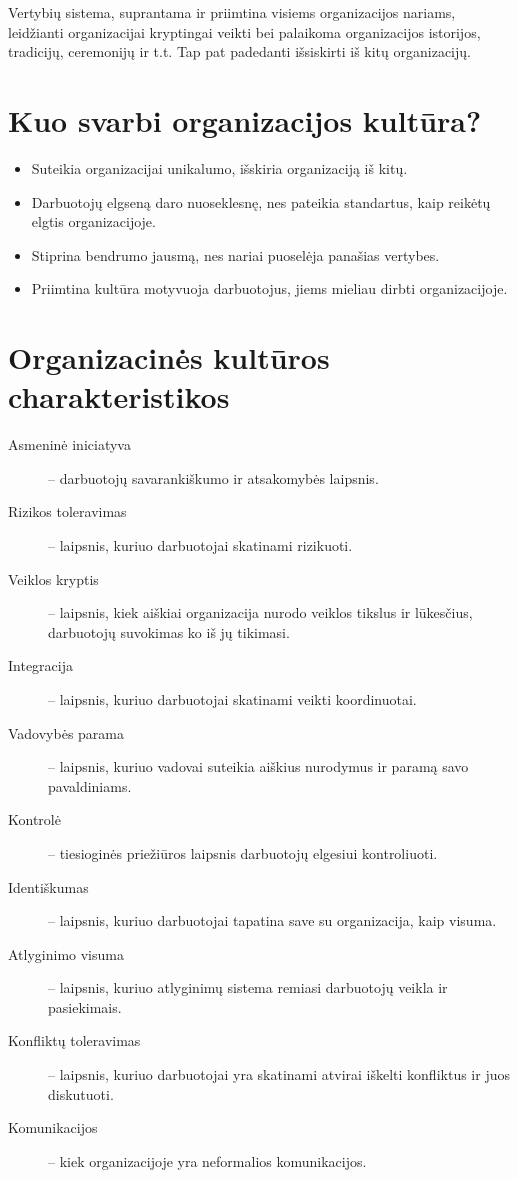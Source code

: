 \begin{defn}
  Vertybių sistema, suprantama ir priimtina visiems organizacijos
  nariams, leidžianti organizacijai kryptingai veikti bei palaikoma
  organizacijos istorijos, tradicijų, ceremonijų ir t.t. Tap pat
  padedanti išsiskirti iš kitų organizacijų.
\end{defn}

\section{Kuo svarbi organizacijos kultūra?}

\begin{itemize}
  \item Suteikia organizacijai unikalumo, išskiria organizaciją iš kitų.
  \item Darbuotojų elgseną daro nuoseklesnę, nes pateikia standartus,
    kaip reikėtų elgtis organizacijoje.
  \item Stiprina bendrumo jausmą, nes nariai puoselėja panašias vertybes.
  \item Priimtina kultūra motyvuoja darbuotojus, jiems mieliau dirbti
    organizacijoje.
\end{itemize}

\section{Organizacinės kultūros charakteristikos}

\begin{description}
  \item[Asmeninė iniciatyva] – darbuotojų savarankiškumo ir atsakomybės
    laipsnis.
  \item[Rizikos toleravimas] – laipsnis, kuriuo darbuotojai skatinami
    rizikuoti.
  \item[Veiklos kryptis] – laipsnis, kiek aiškiai organizacija nurodo
    veiklos tikslus ir lūkesčius, darbuotojų suvokimas ko iš jų tikimasi.
  \item[Integracija] – laipsnis, kuriuo darbuotojai skatinami veikti
    koordinuotai.
  \item[Vadovybės parama] – laipsnis, kuriuo vadovai suteikia aiškius
    nurodymus ir paramą savo pavaldiniams.
  \item[Kontrolė] – tiesioginės priežiūros laipsnis darbuotojų elgesiui
    kontroliuoti.
  \item[Identiškumas] – laipsnis, kuriuo darbuotojai tapatina save su
    organizacija, kaip visuma.
  \item[Atlyginimo visuma] – laipsnis, kuriuo atlyginimų sistema remiasi
    darbuotojų veikla ir pasiekimais.
  \item[Konfliktų toleravimas] – laipsnis, kuriuo darbuotojai yra skatinami
    atvirai iškelti konfliktus ir juos diskutuoti.
  \item[Komunikacijos] – kiek organizacijoje yra neformalios komunikacijos.
\end{description}


